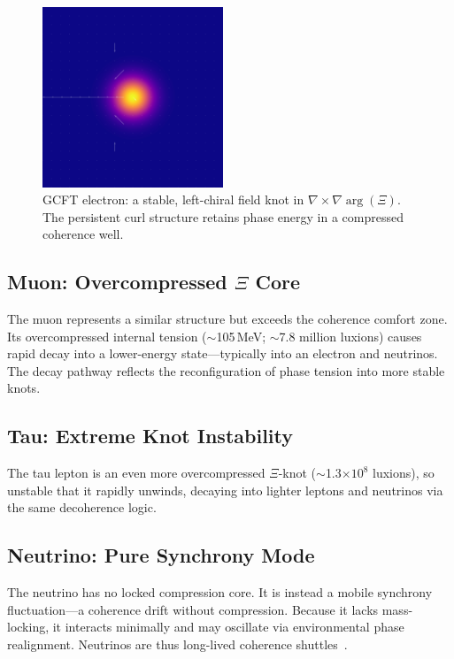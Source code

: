 \begin{figure}[ht]
\centering
\includegraphics[width=0.48\textwidth]{figures/xi_electron_modulus_vector_overlay.png}
\caption{GCFT electron: a stable, left-chiral field knot in $\nabla \times \nabla \arg(\Xi)$. The persistent curl structure retains phase energy in a compressed coherence well.}
\label{fig:xi_electron_knot}
\end{figure}

\subsection{\texorpdfstring{Muon: Overcompressed $\Xi$ Core}{Muon: Overcompressed Xi Core}}

The muon represents a similar structure but exceeds the coherence comfort zone. Its overcompressed internal tension ($\sim$105\,MeV; $\sim$7.8 million luxions) causes rapid decay into a lower-energy state---typically into an electron and neutrinos. The decay pathway reflects the reconfiguration of phase tension into more stable knots.

\subsection{\texorpdfstring{Tau: Extreme Knot Instability}{Tau: Extreme Knot Instability}}

The tau lepton is an even more overcompressed $\Xi$-knot ($\sim$1.3$\times10^8$ luxions), so unstable that it rapidly unwinds, decaying into lighter leptons and neutrinos via the same decoherence logic.

\subsection{Neutrino: Pure Synchrony Mode}

The neutrino has no locked compression core. It is instead a mobile synchrony fluctuation---a coherence drift without compression. Because it lacks mass-locking, it interacts minimally and may oscillate via environmental phase realignment. Neutrinos are thus long-lived coherence shuttles~\cite{Hacquier2025a}.

